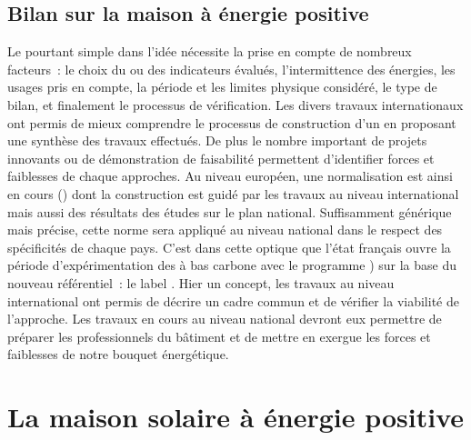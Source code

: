 \subsection{Bilan sur la maison à énergie positive} %
\label{sub:bilan_sur_la_BEPOS}
Le  pourtant simple dans l’idée nécessite la prise en compte de nombreux
facteurs~: le choix du ou des indicateurs évalués, l’intermittence des énergies, les
usages pris en compte, la période et les limites physique considéré, le type de bilan, et
finalement le processus de vérification.
Les divers travaux internationaux ont permis de mieux comprendre le processus de
construction d’un  en proposant une synthèse des travaux effectués.
De plus le nombre important de projets innovants ou de démonstration de faisabilité
permettent d’identifier forces et faiblesses de chaque approches.
Au niveau européen, une normalisation est ainsi en cours () dont la
construction est guidé par les travaux au niveau international mais aussi des résultats
des études sur le plan national. Suffisamment générique mais précise, cette norme
sera appliqué au niveau national dans le respect des spécificités de chaque
pays. C’est dans cette optique que l’état français ouvre la période d’expérimentation des
 à bas carbone avec le programme ) sur la base du nouveau référentiel~: le label .
Hier un concept, les travaux au niveau international ont permis de décrire un cadre
commun et de vérifier la viabilité de l’approche. Les travaux en cours au niveau
national devront eux permettre de préparer les professionnels du bâtiment et de mettre
en exergue les forces et faiblesses de notre bouquet énergétique.





\section{La maison solaire à énergie positive} %
\label{sec:la_maison_solaire_a_energie_positive}
